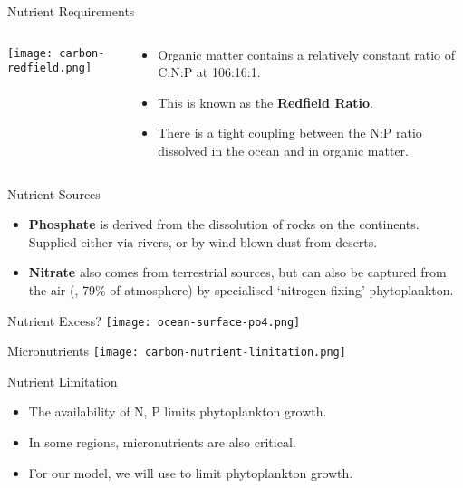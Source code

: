 \documentclass[aspectratio=169]{beamer}
\begin{document}
\begin{frame}{Nutrient Requirements}
    \begin{columns}
        \begin{column}{0.4\linewidth}
            \texttt{[image: carbon-redfield.png]}
        \end{column}
        \begin{column}{0.5\linewidth}
            \begin{itemize}
                \item Organic matter contains a relatively constant ratio of C:N:P at 106:16:1.
                \item This is known as the \textbf{Redfield Ratio}.
                \item There is a tight coupling between the N:P ratio dissolved in the ocean and in organic matter.
            \end{itemize}
        \end{column}
    \end{columns}
\end{frame}

\begin{frame}{Nutrient Sources}
    \begin{itemize}
        \item \textbf{Phosphate} is derived from the dissolution of rocks on the continents. Supplied either via rivers, or by wind-blown dust from deserts.
        \item \textbf{Nitrate} also comes from terrestrial sources, but can also be captured from the air (, 79\% of atmosphere) by specialised `nitrogen-fixing' phytoplankton.
    \end{itemize} 
\end{frame}

\begin{frame}{Nutrient Excess?}
    \centering
    \texttt{[image: ocean-surface-po4.png]}
\end{frame}

\begin{frame}{Micronutrients}
    \centering
    \texttt{[image: carbon-nutrient-limitation.png]}
\end{frame}

\begin{frame}{Nutrient Limitation}

    \begin{itemize}
        \item The availability of N, P limits phytoplankton growth.
        \item In some regions, micronutrients are also critical.
        \item For our model, we will use  to limit phytoplankton growth.
    \end{itemize}

\end{frame}
\end{document}
